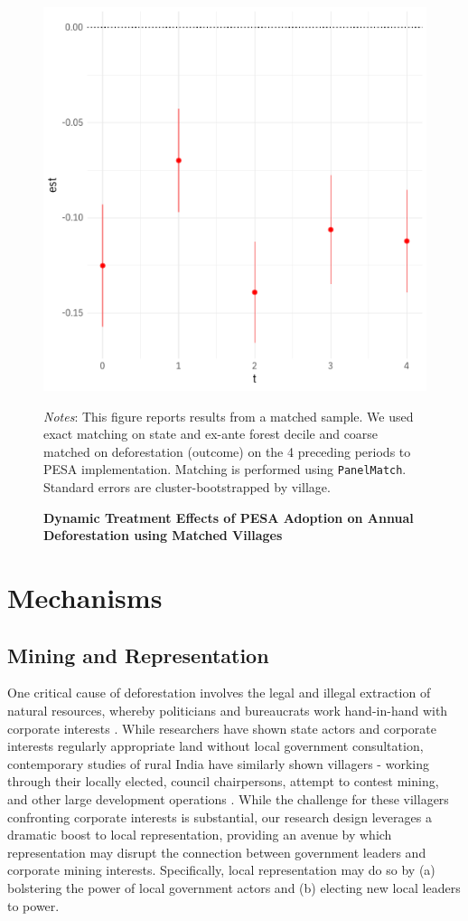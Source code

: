 \documentclass[12pt,reqno]{article}
\begin{document}
\begin{figure}[htbp!]
\begin{center}
\begin{minipage}{1 \linewidth}
  \caption{\textbf{Dynamic Treatment Effects of PESA Adoption on Annual Deforestation using Matched Villages}}
  \label{fig:panelmatch}	
\centerline{\includegraphics[width=3 in,angle=0]{Output/panelmatch_fig.pdf}}
\smallskip
\normalsize
\emph{Notes}: This figure reports results from a matched sample. We used exact matching on state and ex-ante forest decile and coarse matched on deforestation (outcome) on the 4 preceding periods to PESA implementation. Matching is performed using \texttt{PanelMatch}. Standard errors are cluster-bootstrapped by village.
\end{minipage}
\end{center}
\end{figure}



\section{Mechanisms\label{mechanisms}}

\subsection{Mining and Representation} %

One critical cause of deforestation involves the legal and illegal extraction of natural resources, whereby politicians and bureaucrats work hand-in-hand with corporate interests \parencite{Burgess2012-hk}. While researchers have shown state actors and corporate interests regularly appropriate land without local government consultation, contemporary studies of rural India have similarly shown villagers - working through their locally elected, council chairpersons, attempt to contest mining, and other large development operations \parencite{RupeeFund}. While the challenge for these villagers confronting corporate interests is substantial, our research design leverages a dramatic boost to local representation, providing an avenue by which representation may disrupt the connection between government leaders and corporate mining interests. Specifically, local representation may do so by (a) bolstering the power of local government actors and (b) electing new local leaders to power. 
\end{document}
